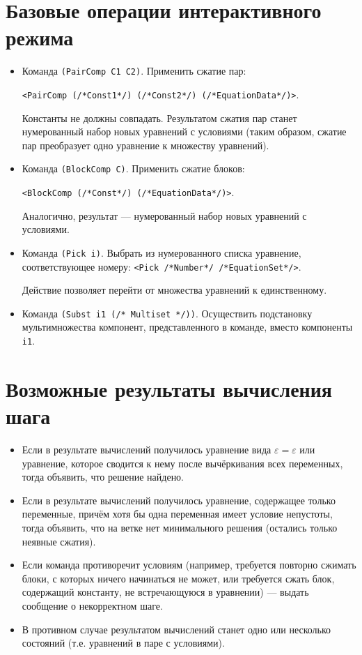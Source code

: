 \documentclass[12pt]{article}
\begin{document}
\section{Базовые операции интерактивного режима}
\begin{itemize}
\item Команда \texttt{(PairComp C1 C2)}. Применить сжатие пар: 

\texttt{<PairComp (/*Const1*/) (/*Const2*/) (/*EquationData*/)>}. 

Константы не должны совпадать. Результатом сжатия пар станет нумерованный набор новых уравнений с условиями (таким образом, сжатие пар преобразует одно уравнение к множеству уравнений).
\item Команда \texttt{(BlockComp C)}. Применить сжатие блоков: 

\texttt{<BlockComp (/*Const*/) (/*EquationData*/)>}. 

Аналогично, результат --- нумерованный набор новых уравнений с условиями.
\item Команда \texttt{(Pick i)}. Выбрать из нумерованного списка уравнение, соответствующее номеру: \texttt{<Pick /*Number*/ /*EquationSet*/>}. 

Действие позволяет перейти от множества уравнений к единственному.
\item Команда \texttt{(Subst i1 (/* Multiset */))}. Осуществить подстановку мультимножества компонент, представленного в команде, вместо компоненты \texttt{i1}.   
\end{itemize}

\section{Возможные результаты вычисления шага}

\begin{itemize}
\item Если в результате вычислений получилось уравнение вида $\varepsilon=\varepsilon$ или уравнение, которое сводится к нему после вычёркивания всех переменных, тогда объявить, что решение найдено.
\item Если в результате вычислений получилось уравнение, содержащее только переменные, причём хотя бы одна переменная имеет условие непустоты, тогда объявить, что на ветке нет минимального решения (остались только неявные сжатия).
\item Если команда противоречит условиям (например, требуется повторно сжимать блоки, с которых ничего начинаться не может, или требуется сжать блок, содержащий константу, не встречающуюся в уравнении) --- выдать сообщение о некорректном шаге.
\item В противном случае результатом вычислений станет одно или несколько состояний (т.е. уравнений в паре с условиями).
\end{itemize}
\end{document}
